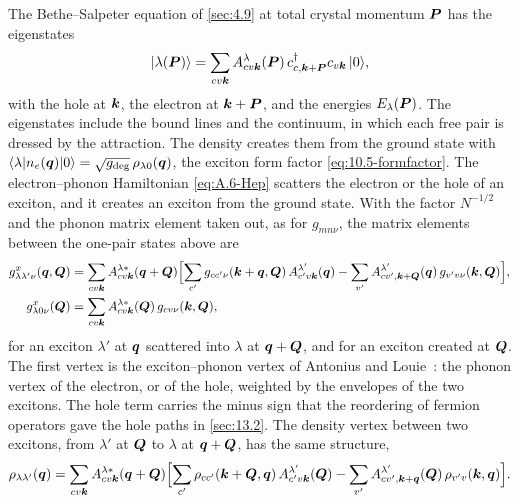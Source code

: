 The Bethe--Salpeter equation of \cref{sec:4.9} at total crystal momentum $\bm{P}$ has the eigenstates
\begin{equation*}
  |\lambda(\bm{P})\rangle = \sum_{cv\bm{k}}A^\lambda_{cv\bm{k}}(\bm{P})\,c^\dagger_{c,\bm{k}+\bm{P}}c_{v\bm{k}}\,|0\rangle ,
\end{equation*}
with the hole at $\bm{k}$, the electron at $\bm{k}+\bm{P}$, and the energies $E_\lambda(\bm{P})$. The eigenstates include the bound lines and the continuum, in which each free pair is dressed by the attraction. The density creates them from the ground state with $\langle\lambda|n_e(\bm{q})|0\rangle = \sqrt{g_{\mathrm{deg}}}\,\rho_{\lambda0}(\bm{q})$, the exciton form factor \cref{eq:10.5-formfactor}. The electron--phonon Hamiltonian \cref{eq:A.6-Hep} scatters the electron or the hole of an exciton, and it creates an exciton from the ground state. With the factor $N^{-1/2}$ and the phonon matrix element taken out, as for $g_{mn\nu}$, the matrix elements between the one-pair states above are
\begin{equation}
  \begin{aligned}
  g^x_{\lambda\lambda'\nu}(\bm{q},\bm{Q}) &= \sum_{cv\bm{k}}A^{\lambda*}_{cv\bm{k}}(\bm{q}+\bm{Q})\Bigl[\sum_{c'}g_{cc'\nu}(\bm{k}+\bm{q},\bm{Q})\,A^{\lambda'}_{c'v\bm{k}}(\bm{q}) - \sum_{v'}A^{\lambda'}_{cv',\bm{k}+\bm{Q}}(\bm{q})\,g_{v'v\nu}(\bm{k},\bm{Q})\Bigr] ,\\
  g^x_{\lambda0\nu}(\bm{Q}) &= \sum_{cv\bm{k}}A^{\lambda*}_{cv\bm{k}}(\bm{Q})\,g_{cv\nu}(\bm{k},\bm{Q}) ,
  \end{aligned}
  \label{eq:13.8-gx}
\end{equation}
for an exciton $\lambda'$ at $\bm{q}$ scattered into $\lambda$ at $\bm{q}+\bm{Q}$, and for an exciton created at $\bm{Q}$. The first vertex is the exciton--phonon vertex of Antonius and Louie~\cite[Eq.~(49)]{antonius2022theory}: the phonon vertex of the electron, or of the hole, weighted by the envelopes of the two excitons. The hole term carries the minus sign that the reordering of fermion operators gave the hole paths in \cref{sec:13.2}. The density vertex between two excitons, from $\lambda'$ at $\bm{Q}$ to $\lambda$ at $\bm{q}+\bm{Q}$, has the same structure,
\begin{equation*}
  \rho_{\lambda\lambda'}(\bm{q}) = \sum_{cv\bm{k}}A^{\lambda*}_{cv\bm{k}}(\bm{q}+\bm{Q})\Bigl[\sum_{c'}\rho_{cc'}(\bm{k}+\bm{Q},\bm{q})\,A^{\lambda'}_{c'v\bm{k}}(\bm{Q}) - \sum_{v'}A^{\lambda'}_{cv',\bm{k}+\bm{q}}(\bm{Q})\,\rho_{v'v}(\bm{k},\bm{q})\Bigr] .
\end{equation*}

